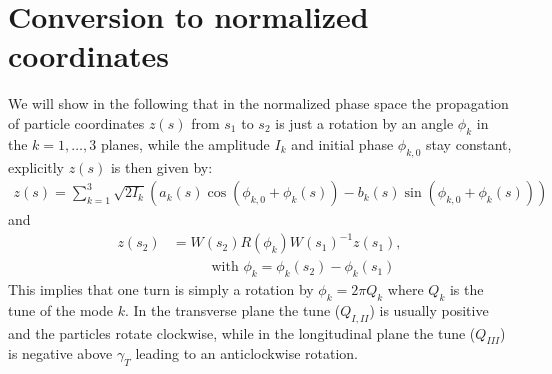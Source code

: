 \section{Conversion to normalized coordinates}
\label{opt:sec:3}
We will show in the following that in the normalized phase space the propagation of particle coordinates $z(s)$ from $s_1$ to $s_2$ is just a rotation by an angle $\phi_k$ in the $k=1,\ldots,3$ planes, while the amplitude $I_k$ and initial phase $\phi_{k,0}$ stay constant, explicitly $z(s)$ is then given by:
\begin{align}\label{opt:eqn:3:3}
z(s)=\sum_{k=1}^3 \sqrt{2I_k}\left(
a_k(s) \cos \left(\phi_{k,0} + \phi_k(s)\right) -
b_k(s) \sin \left(\phi_{k,0} + \phi_k(s)\right)
\right) 
\end{align}
and
\begin{align}
z(s_2)&=W(s_2)R(\phi_k)W(s_1)^{-1}z(s_1), \\
&\hspace{30pt} \text{ with } \phi_k=\phi_k(s_2)-\phi_k(s_1)\nonumber
\end{align}
This implies that one turn is simply a rotation by $\phi_k=2\pi Q_k$ where $Q_k$ is the tune of the mode $k$. In the transverse plane the tune ($Q_{I,II}$) is usually positive and the particles rotate clockwise, while in the longitudinal plane the tune ($Q_{III}$) is negative above $\gamma_T$ leading to an anticlockwise rotation.


